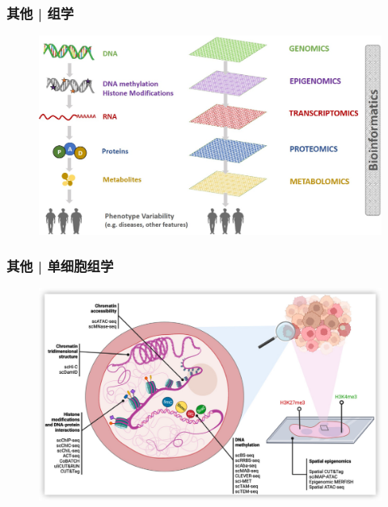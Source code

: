 \documentclass[11pt]{ctexbeamer}
\begin{document}
\begin{frame}
	\frametitle{其他 | 组学}
		\begin{figure}
		\includegraphics[width=\textwidth]{omics_03.png}
	\end{figure}
\end{frame}

\begin{frame}
	\frametitle{其他 | 单细胞组学}
	\begin{figure}
		\includegraphics[width=\textwidth]{omics_10.png}
	\end{figure}
\end{frame}
\end{document}
